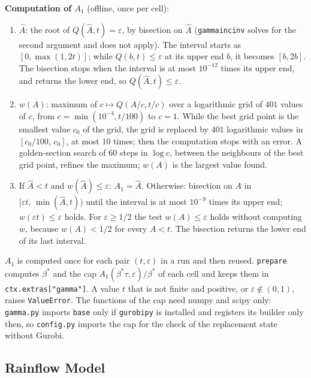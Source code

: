 \documentclass[11pt,a4paper]{article}
\theoremstyle{plain}
\theoremstyle{definition}
\renewcommand{\_}{\textunderscore\allowbreak{}}
\begin{document}
\textbf{Computation of $A_1$} (offline, once per cell):
\begin{enumerate}[leftmargin=1.5em, nosep]
  \item $\hat A$: the root of $Q(\hat A, t) = \varepsilon$, by bisection on $\hat A$ (\texttt{gammaincinv} solves for the second argument and does not apply). The interval starts as $[0, \max(1, 2t)]$; while $Q(b, t) \le \varepsilon$ at its upper end $b$, it becomes $[b, 2b]$. The bisection stops when the interval is at most $10^{-12}$ times its upper end, and returns the lower end, so $Q(\hat A, t) \le \varepsilon$.
  \item $w(A)$: maximum of $c \mapsto Q(A/c, t/c)$ over a logarithmic grid of $401$ values of $c$, from $c = \min(10^{-4}, t/100)$ to $c = 1$. While the best grid point is the smallest value $c_0$ of the grid, the grid is replaced by $401$ logarithmic values in $[c_0/100,\, c_0]$, at most $10$ times; then the computation stops with an error. A golden-section search of $60$ steps in $\log c$, between the neighbours of the best grid point, refines the maximum; $w(A)$ is the largest value found.
  \item If $\hat A < t$ and $w(\hat A) \le \varepsilon$: $A_1 = \hat A$. Otherwise: bisection on $A$ in $[\varepsilon t,\, \min(\hat A, t))$ until the interval is at most $10^{-9}$ times its upper end; $w(\varepsilon t) \le \varepsilon$ holds. For $\varepsilon \ge 1/2$ the test $w(A) \le \varepsilon$ holds without computing $w$, because $w(A) < 1/2$ for every $A < t$. The bisection returns the lower end of its last interval.
\end{enumerate}
$A_1$ is computed once for each pair $(t, \varepsilon)$ in a run and then reused.
\texttt{prepare} computes $\beta^*$ and the cap $A_1(\beta^*\tau, \varepsilon)/\beta^*$ of each cell and keeps them in
\texttt{ctx.extras["gamma"]}. A value $t$ that is not finite and positive, or $\varepsilon \notin (0, 1)$, raises
\texttt{ValueError}. The functions of the cap need numpy and scipy only: \texttt{gamma.py} imports \texttt{base}
only if \texttt{gurobipy} is installed and registers its builder only then, so \texttt{config.py} imports the cap
for the check of the replacement state without Gurobi.

\subsection{Rainflow Model}
\label{sec:dyn_rainflow}
\end{document}
